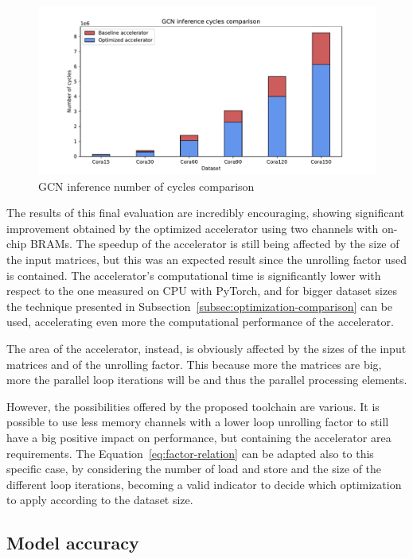 \begin{figure}[t!]
    \centering
    \includegraphics[height=0.4\textwidth]{Images/gcn_forward_cycles_comparison}
    \caption{GCN inference number of cycles comparison}
    \label{fig:gcn-inference-cycles-comparison}
\end{figure}

The results of this final evaluation are incredibly encouraging, showing significant improvement obtained by the optimized accelerator using two channels with on-chip BRAMs.
The speedup of the accelerator is still being affected by the size of the input matrices, but this was an expected result since the unrolling factor used is contained.
The accelerator's computational time is significantly lower with respect to the one measured on CPU with PyTorch, and for bigger dataset sizes the technique presented in Subsection~\ref{subsec:optimization-comparison} can be used, accelerating even more the computational performance of the accelerator.

The area of the accelerator, instead, is obviously affected by the sizes of the input matrices and of the unrolling factor.
This because more the matrices are big, more the parallel loop iterations will be and thus the parallel processing elements.

However, the possibilities offered by the proposed toolchain are various.
It is possible to use less memory channels with a lower loop unrolling factor to still have a big positive impact on performance, but containing the accelerator area requirements.
The Equation~\ref{eq:factor-relation} can be adapted also to this specific case, by considering the number of load and store and the size of the different loop iterations, becoming a valid indicator to decide which optimization to apply according to the dataset size.

\subsection{Model accuracy}
\label{subsec:modeol-accuracy}%

